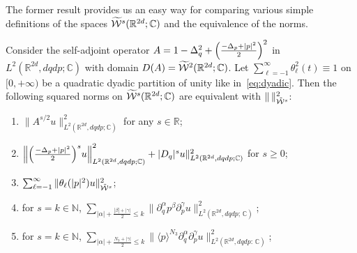 \documentclass[10pt]{amsart}
\theoremstyle{definition}\newtheorem{defi}[theo]{Definition}\newtheorem{rema}[theo]{Remark}\newtheorem{exam}[theo]{Example}\newtheorem{exem}[theo]{Example}\newtheorem{nota}[theo]{Notation}
\newcommand{\C}{\mathbb{C}}
\newcommand{\R}{\mathbb{R}}
\newcommand{\N}{\mathbb{N}}
\newcommand{\clW}{\mathcal{W}}
\newcommand*{\relabel}{\renewcommand{\labelenumi}{(\theenumi)}}
\newcommand*{\romanenumi}{\renewcommand*{\theenumi}{\roman{enumi}}\relabel}
\let\oldtilde\tilde
\renewcommand*{\tilde}[1]{\mathchoice{\widetilde{#1}}{\widetilde{#1}}{\oldtilde{#1}}{\oldtilde{#1}}}
\let\originalleft\left
\let\originalright\right
\renewcommand{\left}{\mathopen{}\mathclose\bgroup\originalleft}
\renewcommand{\right}{\aftergroup\egroup\originalright}
\begin{document}
The former result provides us an easy way for comparing various simple definitions of the spaces $\tilde{\clW}^{s}(\R^{2d};\C)$ and the equivalence of the norms.
\begin{prop}\label{pr:eqnormes}
Consider the self-adjoint operator $A=1-\Delta_{q}^{2}+\left(\frac{-\Delta_{p}+|p|^{2}}{2}\right)^{2}$ in $L^{2}(\R^{2d},dqdp;\C)$ with domain $D(A)=\tilde{\clW}^{2}(\R^{2d};\C)$. Let $\sum_{\ell=-1}^{\infty}\theta_{\ell}^{2}(t)\equiv 1$ on $[0,+\infty)$ be a quadratic dyadic partition of unity like in~\eqref{eq:dyadic}. Then the following squared norms on $\tilde{\clW}^{s}(\R^{2d};\C)$ are equivalent with $\|\,\|^{2}_{\tilde{\clW}^{s}}$:
\begin{enumerate}\romanenumi
\item\label{propE.7.1} $\|A^{s/2}u\|^{2}_{L^{2}(\R^{2d},dqdp;\C)}$ for any $s\in \R$;
\item\label{propE.7.2} $\left\|\left(\frac{-\Delta_p+|p|^2}{2}\right)^s u\right\|^2_{L^{2}(\R^{2d},dqdp;\C)}+|D_q|^s u\|^2_{L^{2}(\R^{2d},dqdp;\C)}$ for $s\geq 0$;
\item\label{propE.7.3} $\sum_{\ell=-1}^{\infty}\|\theta_{\ell}(|p|^{2})u\|^{2}_{\tilde{\clW}^{s}}$;
\item\label{propE.7.4} for $s=k\in \N$, $\sum_{|\alpha|+\frac{|\beta|+|\gamma|}{2}\leq k}\|\partial_{q}^{\alpha}p^{\beta}\partial_{p}^{\gamma}u\|^{2}_{L^{2}(\R^{2d},dqdp;\,\C)}$;
\item\label{propE.7.5} for $s=k\in \N$, $\sum_{|\alpha|+\frac{N_{3}+|\gamma|}{2}\leq k}\|\langle p\rangle^{N_{3}}\partial_{q}^{\alpha}\partial_{p}^{\gamma}u\|^{2}_{L^{2}(\R^{2d},dqdp:\,\C)}$;
\end{enumerate}
\end{prop}
\end{document}
